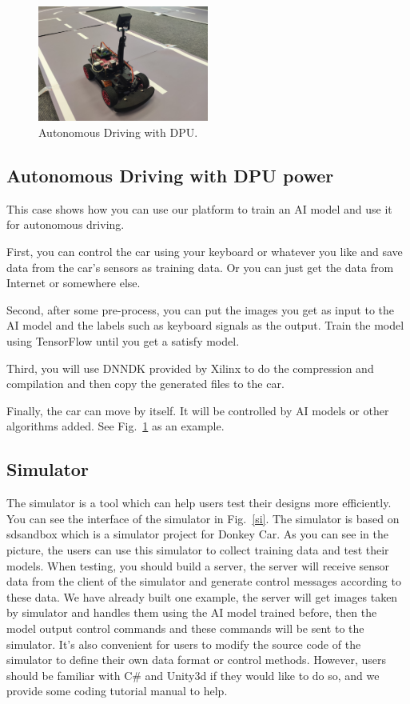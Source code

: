 \documentclass[conference]{IEEEtran}
\begin{document}
\begin{sloppypar}
\begin{figure}[htbp]
\centerline{\includegraphics[width=0.5\textwidth]{fpt.jpg}}
\caption{Autonomous Driving with DPU.}
\label{fpt}
\end{figure}

\subsection{Autonomous Driving with DPU power}
This case shows how you can use our platform to train an AI model and use it for autonomous driving. 

First, you can control the car using your keyboard or whatever you like and save data from the car's sensors as training data. Or you can just get the data from Internet or somewhere else. 

Second, after some pre-process, you can put the images you get as input to the AI model and the labels such as keyboard signals as the output. Train the model using TensorFlow until you get a satisfy model.

Third, you will use DNNDK\cite{b17} provided by Xilinx to do the compression and compilation and then copy the generated files to the car.

Finally, the car can move by itself. It will be controlled by AI models or other algorithms added. See Fig.~\ref{fpt} as an example.

\subsection{Simulator}
The simulator is a tool which can help users test their designs more efficiently. You can see the interface of the simulator in Fig.~\ref{si}. The simulator is based on sdsandbox\cite{b5} which is a simulator project for Donkey Car\cite{b34}. As you can see in the picture, the users can use this simulator to collect training data and test their models. 
When testing, you should build a server, the server will receive sensor data from the client of the simulator and generate control messages according to these data. We have already built one example, the server will get images taken by simulator and handles them using the AI model trained before, then the model output control commands and these commands will be sent to the simulator.
It's also convenient for users to modify the source code of the simulator to define their own data format or control methods. However, users should be familiar with C\# and Unity3d if they would like to do so, and we provide some coding tutorial manual to help.


\end{sloppypar}
\end{document}
